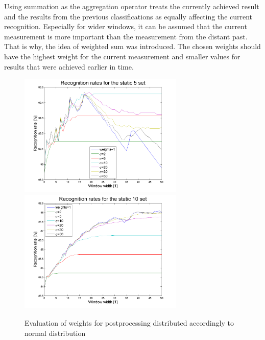 Using summation as the aggregation operator treats the currently achieved result and the results from the previous classifications as equally affecting the current recognition. 
Especially for wider windows, it can be assumed that the current measurement is more important than the measurement from the distant past.
That is why, the idea of weighted sum was introduced.
The chosen weights should have the highest weight for the current measurement and smaller values for results that were achieved earlier in time.

\begin{figure}[htbp!]
\centering
 \includegraphics[width=0.7\textwidth]{figures/gaussSum5.png}
\centering
 \includegraphics[width=0.7\textwidth]{figures/gaussSum10.png}
 
 \caption{Evaluation of weights for postprocessing distributed accordingly to normal distribution}
 \label{staticgauss}
\end{figure}

